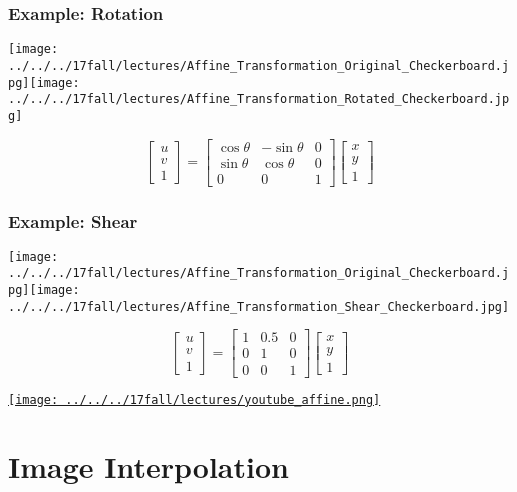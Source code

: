 \documentclass{beamer}
\begin{document}
\begin{frame}
  \frametitle{Example: Rotation}
  \centerline{\texttt{[image: ../../../17fall/lectures/Affine\_Transformation\_Original\_Checkerboard.jpg]}\texttt{[image: ../../../17fall/lectures/Affine\_Transformation\_Rotated\_Checkerboard.jpg]}}
  \[
  \left[\begin{array}{c} u\\v\\1\end{array}\right]=
  \left[\begin{array}{ccc}\cos\theta&-\sin\theta&0\\\sin\theta&\cos\theta&0\\0&0&1\end{array}\right]
  \left[\begin{array}{c}x\\y\\1\end{array}\right]
  \]
\end{frame}

\begin{frame}
  \frametitle{Example: Shear}
  \centerline{\texttt{[image: ../../../17fall/lectures/Affine\_Transformation\_Original\_Checkerboard.jpg]}\texttt{[image: ../../../17fall/lectures/Affine\_Transformation\_Shear\_Checkerboard.jpg]}}
  \[
  \left[\begin{array}{c} u\\v\\1\end{array}\right]=
  \left[\begin{array}{ccc}1&0.5&0\\0&1&0\\0&0&1\end{array}\right]
  \left[\begin{array}{c}x\\y\\1\end{array}\right]
  \]
\end{frame}

\begin{frame}
  \centerline{\href{https://www.youtube.com/watch?v=il6Z5LCykZk}{\texttt{[image: ../../../17fall/lectures/youtube\_affine.png]}}}
\end{frame}

\section{Image Interpolation}
\setcounter{subsection}{1}
\end{document}
